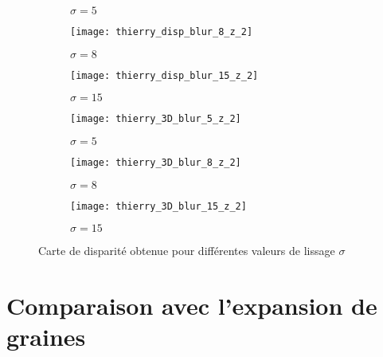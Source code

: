 \documentclass[12pt,a4paper,onecolumn]{article}
\begin{document}
\begin{figure}[H]
\begin{subfigure}[b]{0.3\textwidth}
		\caption{\(\sigma = 5\)}
		\label{fig_thierry_disp_5}
	\end{subfigure}
	\hfill
	\begin{subfigure}[b]{0.3\textwidth}
		\centering
		\texttt{[image: thierry\_disp\_blur\_8\_z\_2]}
		\caption{\(\sigma = 8\)}
		\label{fig_thierry_disp_8}
	\end{subfigure}
	\hfill
	\begin{subfigure}[b]{0.3\textwidth}
		\centering
		\texttt{[image: thierry\_disp\_blur\_15\_z\_2]}
		\caption{\(\sigma = 15\)}
		\label{fig_thierry_disp_15}
	\end{subfigure}
	\hfill
	\begin{subfigure}[b]{0.3\textwidth}
		\centering
		\texttt{[image: thierry\_3D\_blur\_5\_z\_2]}
		\caption{\(\sigma = 5\)}
		\label{fig_thierry_3D_5}
	\end{subfigure}
	\hfill
	\begin{subfigure}[b]{0.3\textwidth}
		\centering
		\texttt{[image: thierry\_3D\_blur\_8\_z\_2]}
		\caption{\(\sigma = 8\)}
		\label{fig_thierry_3D_8}
	\end{subfigure}
	\hfill
	\begin{subfigure}[b]{0.3\textwidth}
		\centering
		\texttt{[image: thierry\_3D\_blur\_15\_z\_2]}
		\caption{\(\sigma = 15\)}
		\label{fig_thierry_3D_15}
	\end{subfigure}
	\caption{Carte de disparité obtenue pour différentes valeurs de lissage \(\sigma\)}
	\label{fig_thierry}
\end{figure}


\section{Comparaison avec l'expansion de graines}
\end{document}

